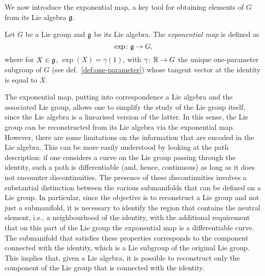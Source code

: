 We now introduce the exponential map, a key tool for obtaining elements of $G$ from its Lie algebra $\mathfrak{g}$.

\begin{definition}\label{def:exponential-map}
    Let $G$ be a Lie group and $\mathfrak{g}$ be its Lie algebra. The \emph{exponential map} is defined as
    \begin{equation}\label{eq:exp-map}
        \exp\colon \mathfrak{g} \to G ,
    \end{equation}
    where for $X \in \mathfrak{g}$, $\exp(X) = \gamma(1)$, with $\gamma\colon \mathbb{R} \to G$ the unique one-parameter subgroup of $G$ (see def.~\ref{def:one-parameter}) whose tangent vector at the identity is equal to $X$.
\end{definition}

The exponential map, putting into correspondence a Lie algebra and the associated Lie group, allows one to simplify the study of the Lie group itself, since the Lie algebra is a linearised version of the latter. In this sense, the Lie group can be reconstructed from its Lie algebra via the exponential map. However, there are some limitations on the information that are encoded in the Lie algebra. This can be more easily understood by looking at the path description: if one considers a curve on the Lie group passing through the identity, such a path is differentiable (and, hence, continuous) as long as it does not encounter discontinuities. The presence of these discontinuities involves a substantial distinction between the various submanifolds that can be defined on a Lie group. In particular, since the objective is to reconstruct a Lie group and not just a submanifold, it is necessary to identify the region that contains the neutral element, i.e., a neighbourhood of the identity, with the additional requirement that on this part of the Lie group the exponential map is a differentiable curve. The submanifold that satisfies these properties corresponds to the component connected with the identity, which is a Lie subgroup of the original Lie group. This implies that, given a Lie algebra, it is possible to reconstruct only the component of the Lie group that is connected with the identity.

